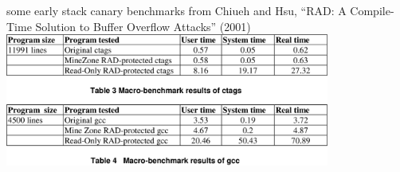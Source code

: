 
\begin{frame}{some early stack canary benchmarks}
{\small from Chiueh and Hsu, ``RAD: A Compile-Time Solution to Buffer Overflow Attacks'' (2001)}
\includegraphics[width=0.8\textwidth]{../mitigate/rad-results}
\end{frame}
